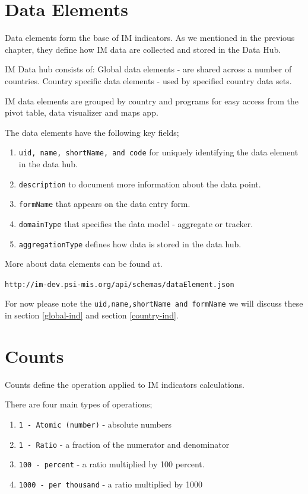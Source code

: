 \documentclass[]{book}
\providecommand{\tightlist}{%
  \setlength{\itemsep}{0pt}\setlength{\parskip}{0pt}}
\begin{document}
\hypertarget{data-elements-1}{%
\section{Data Elements}\label{data-elements-1}}

Data elements form the base of IM indicators. As we mentioned in the previous chapter, they define how IM data are collected and stored in the Data Hub.

IM Data hub consists of:
Global data elements - are shared across a number of countries.
Country specific data elements - used by specified country data sets.

IM data elements are grouped by country and programs for easy access from the pivot table, data visualizer and maps app.

The data elements have the following key fields;

\begin{enumerate}
\def\labelenumi{\arabic{enumi}.}
\tightlist
\item
  \texttt{uid,\ name,\ shortName,\ and\ code} for uniquely identifying the data element in the data hub.
\item
  \texttt{description} to document more information about the data point.
\item
  \texttt{formName} that appears on the data entry form.
\item
  \texttt{domainType} that specifies the data model - aggregate or tracker.
\item
  \texttt{aggregationType} defines how data is stored in the data hub.
\end{enumerate}

More about data elements can be found at.

\texttt{http://im-dev.psi-mis.org/api/schemas/dataElement.json}

For now please note the \texttt{uid,name,shortName\ and\ formName} we will discuss these in section \ref{global-ind} and section \ref{country-ind}.

\hypertarget{counts}{%
\section{Counts}\label{counts}}

Counts define the operation applied to IM indicators calculations.

There are four main types of operations;

\begin{enumerate}
\def\labelenumi{\arabic{enumi}.}
\tightlist
\item
  \texttt{1\ -\ Atomic\ (number)} - absolute numbers
\item
  \texttt{1\ -\ Ratio} - a fraction of the numerator and denominator
\item
  \texttt{100\ -\ percent} - a ratio multiplied by 100 percent.
\item
  \texttt{1000\ -\ per\ thousand} - a ratio multiplied by 1000
\end{enumerate}
\end{document}
